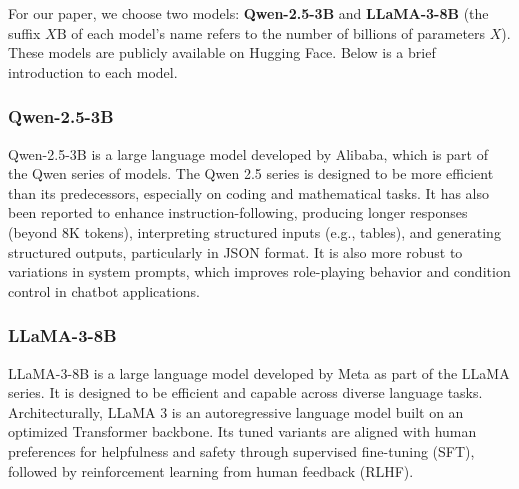 For our paper, we choose two models: \textbf{Qwen-2.5-3B} and \textbf{LLaMA-3-8B} (the suffix $X\text{B}$ of each model's name refers to the number of billions of parameters $X$). These models are publicly available on Hugging Face. Below is a brief introduction to each model.

\subsubsection{Qwen-2.5-3B}

Qwen-2.5-3B is a large language model developed by Alibaba, which is part of the Qwen series of models. The Qwen 2.5 series is designed to be more efficient than its predecessors, especially on coding and mathematical tasks. It has also been reported to enhance 
instruction-following, producing longer responses (beyond 8K tokens), interpreting structured inputs (e.g., tables), and generating structured outputs, particularly in JSON format. It is also more robust to variations in system prompts, which improves role-playing behavior and condition control in chatbot applications.

\subsubsection{LLaMA-3-8B}

LLaMA-3-8B is a large language model developed by Meta as part of the LLaMA series. It is designed to be efficient and capable across diverse language tasks. Architecturally, LLaMA 3 is an autoregressive language model built on an optimized Transformer backbone. Its tuned variants are aligned with human preferences for helpfulness and safety through supervised fine-tuning (SFT), followed by reinforcement learning from human feedback (RLHF).